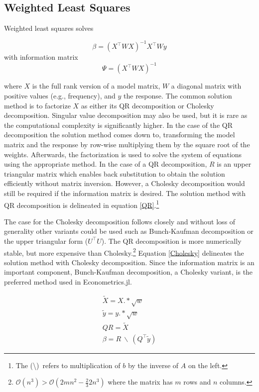 \documentclass{juliacon}
\begin{document}
\subsection{Weighted Least Squares}

Weighted least squares solves

\begin{equation}
	\beta = \left(X^{\top} W X\right)^{-1} X^{\top} W y
\end{equation}
with information matrix
\begin{equation}
\Psi = \left(X^{\top} W X\right)^{-1}
\end{equation}

where $X$ is the full rank version of a model matrix, $W$ a diagonal matrix with positive values (e.g., frequency), and $y$ the response. The common solution method is to factorize $X$ as either its QR decomposition or Cholesky decomposition. Singular value decomposition may also be used, but it is rare as the computational complexity is significantly higher. In the case of the QR decomposition the solution method comes down to, transforming the model matrix and the response by row-wise multiplying them by the square root of the weights. Afterwards, the factorization is used to solve the system of equations using the appropriate method. In the case of a QR decomposition, $R$ is an upper triangular matrix which enables back substitution to obtain the solution efficiently without matrix inversion. However, a Cholesky decomposition would still be required if the information matrix is desired. The solution method with QR decomposition is delineated in equation \ref{QR}.\footnote{The (\textbackslash)\ refers to multiplication of $b$ by the inverse of $A$ on the left.}

The case for the Cholesky decomposition follows closely and without loss of generality other variants could be used such as Bunch-Kaufman decomposition or the upper triangular form ($U^{\top}U$). The QR decomposition is more numerically stable, but more expensive than Cholesky.\footnote{$\mathcal{O}\left(n^{3}\right) > \mathcal{O}\left(2mn^{2}-\frac{2}{3}2n^{3}\right)$ where the matrix has $m$ rows and $n$ columns.} Equation \ref{Cholesky} delineates the solution method with Cholesky decomposition. Since the information matrix is an important component, Bunch-Kaufman decomposition, a Cholesky variant, is the preferred method used in Econometrics.jl.

\begin{equation}
\label{QR}
\begin{split}
	\tilde{X} = X .* \sqrt{w} \\
	\tilde{y} = y .* \sqrt{w} \\
	QR = \tilde{X} \\
	\beta = R \ \backslash \ \left( Q^{\top} \tilde{y} \right)
\end{split}
\end{equation}
\end{document}
